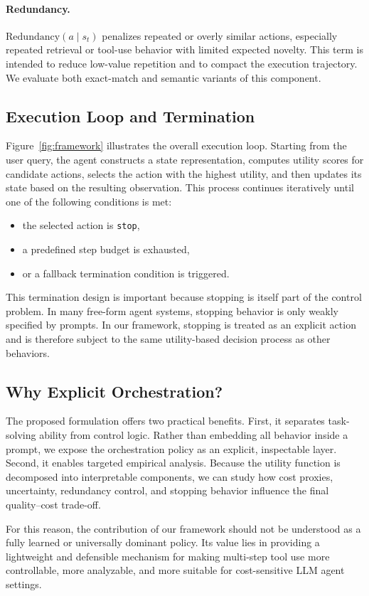 \paragraph{Redundancy.}
$\mathrm{Redundancy}(a \mid s_t)$ penalizes repeated or overly similar actions, especially repeated retrieval or tool-use behavior with limited expected novelty. This term is intended to reduce low-value repetition and to compact the execution trajectory. We evaluate both exact-match and semantic variants of this component.

\subsection{Execution Loop and Termination}

Figure~\ref{fig:framework} illustrates the overall execution loop. Starting from the user query, the agent constructs a state representation, computes utility scores for candidate actions, selects the action with the highest utility, and then updates its state based on the resulting observation. This process continues iteratively until one of the following conditions is met:
\begin{itemize}
    \item the selected action is \texttt{stop},
    \item a predefined step budget is exhausted,
    \item or a fallback termination condition is triggered.
\end{itemize}

This termination design is important because stopping is itself part of the control problem. In many free-form agent systems, stopping behavior is only weakly specified by prompts. In our framework, stopping is treated as an explicit action and is therefore subject to the same utility-based decision process as other behaviors.

\subsection{Why Explicit Orchestration?}

The proposed formulation offers two practical benefits. First, it separates task-solving ability from control logic. Rather than embedding all behavior inside a prompt, we expose the orchestration policy as an explicit, inspectable layer. Second, it enables targeted empirical analysis. Because the utility function is decomposed into interpretable components, we can study how cost proxies, uncertainty, redundancy control, and stopping behavior influence the final quality--cost trade-off.

For this reason, the contribution of our framework should not be understood as a fully learned or universally dominant policy. Its value lies in providing a lightweight and defensible mechanism for making multi-step tool use more controllable, more analyzable, and more suitable for cost-sensitive LLM agent settings.